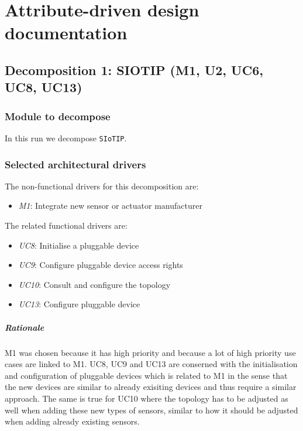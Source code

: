 \documentclass[english]{sareport}
\begin{document}
\maketitle

\tableofcontents


\chapter{Attribute-driven design documentation}\label{sec:add}
\section{Decomposition 1: SIOTIP (M1, U2, UC6, UC8, UC13)}
\subsection{Module to decompose}
In this run we decompose \texttt{SIoTIP}.

\subsection{Selected architectural drivers}
The non-functional drivers for this decomposition are:

\begin{itemize}
	\item \emph{M1}: Integrate new sensor or actuator manufacturer
\end{itemize}
The related functional drivers are:

\begin{itemize}
	\item \emph{UC8}: Initialise a pluggable device
	\item \emph{UC9}: Configure pluggable device access rights
	\item \emph{UC10}: Consult and configure the topology
	\item \emph{UC13}: Configure pluggable device
\end{itemize}

\paragraph{Rationale}
M1 was chosen because it has high priority and because a lot of high priority use cases are linked to M1. UC8, UC9 and UC13 are conserned with the initialisation and configuration of pluggable devices which is related to M1 in the sense that the new devices are similar to already exisiting devices and thus require a similar approach. The same is true for UC10 where the topology has to be adjusted as well when adding these new types of sensors, similar to how it should be adjusted when adding already existing sensors. 
\end{document}
